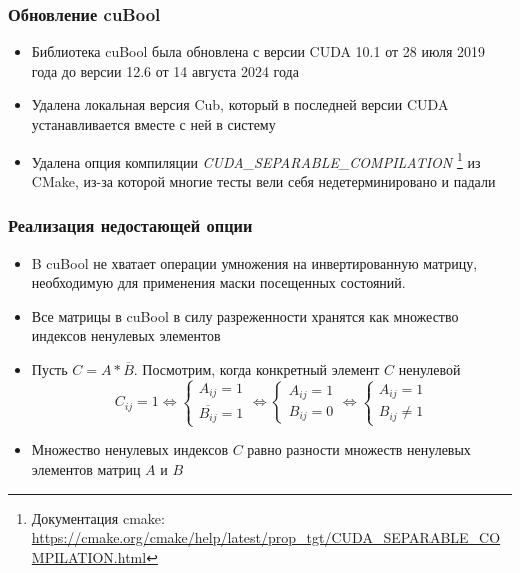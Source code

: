 \documentclass{beamer}
\begin{document}

\begin{frame}  
  \frametitle{Обновление cuBool}

  \begin{itemize}
     \item Библиотека cuBool была обновлена с версии CUDA 10.1 от 28 июля 2019 года до версии 12.6 от 14 августа 2024 года
     \item Удалена локальная версия Cub, который в последней версии CUDA устанавливается вместе с ней в систему
     \item Удалена опция компиляции \textit{CUDA\_SEPARABLE\_COMPILATION}
\footnote{Документация cmake: \url{https://cmake.org/cmake/help/latest/prop_tgt/CUDA_SEPARABLE_COMPILATION.html}}
из CMake, из-за которой многие тесты вели себя недетерминировано и падали
  \end{itemize} 
\end{frame}

\begin{frame}  
    \frametitle{Реализация недостающей опции}

    \begin{itemize}
        \item B cuBool не хватает операции умножения на инвертированную матрицу, необходимую для применения маски посещенных состояний.
        \item Все матрицы в cuBool в силу разреженности хранятся как множество индексов ненулевых элементов
        \item Пусть $C = A * \overline{B}$. Посмотрим, когда конкретный элемент $C$ ненулевой
$$
C_{ij} = 1
\Longleftrightarrow
\begin{cases}
    A_{ij} = 1 \\
    \overline{B_{ij}} = 1
\end{cases}
\Longleftrightarrow
\begin{cases}
    A_{ij} = 1 \\
    B_{ij} = 0
\end{cases}
\Longleftrightarrow
\begin{cases}
    A_{ij} = 1 \\
    B_{ij} \ne 1
\end{cases}
$$
    \item Множество ненулевых индексов $C$ равно разности множеств ненулевых элементов матриц $A$ и $B$
    \end{itemize}
    
\end{frame}
\end{document}
